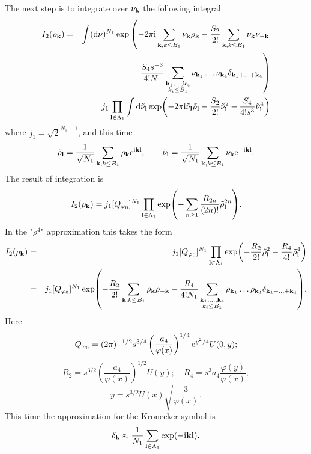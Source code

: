 The next step is to integrate over $\nu_{\vb k}$ the following integral
\begin{eqnarray*}
	I_2(\rho_{\vb k}) & = & \int ({\rm d} \nu)^{N_1} 
	\exp 
	\left(-2\pi{\rm i} \sum_{\vb k, k \leq B_1} \nu_{\vb k}\rho_{\vb k} 
		-\frac{S_2}{2!} \sum_{\vb k, k \leq B_1} \nu_{\vb k}\nu_{-\vb k}
	\right.
	\\
	& &
	\left. 
		- \frac{S_4 s^{-3}}{4! N_1} \sum_{\substack{\vb k_1, \dotsc, \vb k_4 \\ k_i \leq B_1}} \nu_{\vb k_1} \dotsc \nu_{\vb k_4} \delta_{\vb{k}_1 + \dotsc + \vb{k}_4}
	\right)
	\\
	& = &
	j_1 \prod_{\vb l \in \Lambda_1} \int {\rm d} \tilde{\nu}_{\vb l} 
	\exp(-2\pi {\rm i} \tilde{\nu}_{\vb l} \tilde{\rho}_{\vb l} - \frac{S_2}{2!}\tilde{\nu}_{\vb l}^2
	- \frac{S_4}{4! s^3} \tilde{\nu}_{\vb l}^4  )
\end{eqnarray*}
where $j_1 = \sqrt{2}^{N_1 - 1}$, and this time
\begin{equation*}
	\tilde{\rho}_{\vb l} = \frac{1}{\sqrt{N_1}}\sum_{\vb k, k \leq B_1}\rho_{\vb k}{\rm e}^{{\rm i}{\vb k}{\vb l}}
	, \qquad 
	\tilde{\nu}_{\vb l}=\frac{1}{\sqrt{N_1}}\sum_{\vb k, k \leq B_1}\nu_{\vb k}{\rm e}^{-{\rm i}{\vb k}{\vb l}}.
\end{equation*}
The result of integration is
\begin{equation*}
	I_2(\rho_{\vb k}) = j_1 [Q_{\varphi_0}]^{N_1} \prod_{\vb l \in \Lambda_1} 
	\exp(- \sum_{n \geq 1} \frac{R_{2n}}{(2n)!} \tilde{\rho}_{\vb l}^{2n} ).
\end{equation*}
In the "$\rho^4$" approximation this takes the form
\begin{eqnarray*}
	I_2(\rho_{\vb k}) & = & j_1 [Q_{\varphi_0}]^{N_1} \prod_{\vb l \in \Lambda_1}
	\exp( - \frac{R_2}{2!} \tilde{\rho}_{\vb l}^2 - \frac{R_4}{4!} \tilde{\rho}_{\vb l}^4)
	\\
	& = & j_1 [Q_{\varphi_0}]^{N_1} 
	\exp( -\frac{R_2}{2!} \sum_{\vb k, k \leq B_1} \rho_{\vb k} \rho_{-\vb k} - \frac{R_4}{4!N_1} 
	\sum_{\substack{\vb k_1, \dotsc, \vb k_4 \\ k_i \leq B_1}} \rho_{\vb k_1} \dotsc \rho_{\vb k_4} \delta_{\vb{k}_1 + \dotsc + \vb{k}_4}).
\end{eqnarray*}
Here
\begin{equation*}
	Q_{\varphi_0} = (2\pi)^{-1/2} s^{3/4} \left(\frac{a_4}{\varphi(x)}\right)^{1/4} {\rm e}^{y^2/4} U(0,y);
\end{equation*}
\begin{equation*}
	R_2 = s^{3/2} \left(\frac{a_4}{\varphi(x)}\right)^{1/2} U(y); \quad R_4 = s^3 a_4 \frac{\varphi(y)}{\varphi(x)};
\end{equation*}
\begin{equation*}
	y = s^{3/2} U(x) \sqrt{\frac{3}{\varphi(x)}}.
\end{equation*}
This time the approximation for the Kronecker symbol is 
$$
	\delta_{\vb k} \approx \frac{1}{N_1} \sum_{\vb l \in \Lambda_1} \exp(-{\rm i} \vb{k} \vb{l}).
$$

